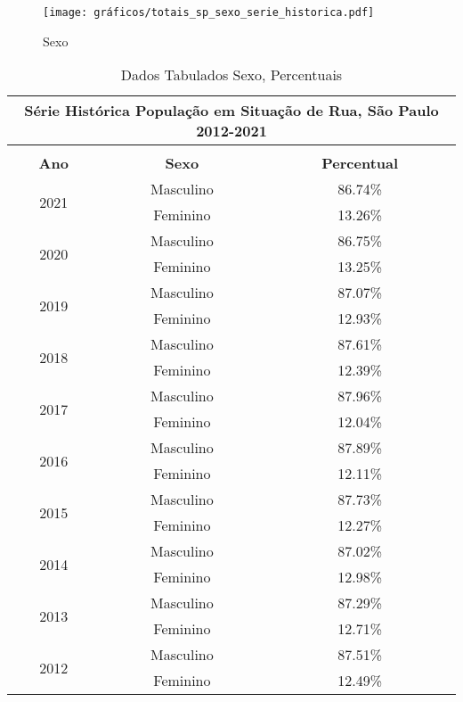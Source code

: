 \documentclass[14pt]{extarticle}
\begin{document}
\begin{figure}[H]
\centering
	\caption{Sexo}
	\texttt{[image: gráficos/totais\_sp\_sexo\_serie\_historica.pdf]}
	\label{fig:sexo}
\end{figure}



\begin{table}[htbp]
 \centering
  \caption{Dados Tabulados Sexo, Percentuais}
  \tabcolsep=0.15cm
	\renewcommand{\arraystretch}{1.0}
	\begin{adjustbox}{max width=\linewidth}
      \begin{tabular}{ccc}
    \toprule
    \multicolumn{3}{c}{Série Histórica População em Situação de Rua, São Paulo 2012-2021} \\
    \midrule
    \multicolumn{3}{c}{} \\
    \midrule
    \rowcolor[rgb]{ .906,  .902,  .902} \textbf{Ano} & \textbf{Sexo} & \textbf{Percentual} \\
    \midrule
    \multirow{2}[2]{*}{2021} & Masculino & 86.74\% \\
          & Feminino & 13.26\% \\
    \midrule
    \multirow{2}[2]{*}{2020} & Masculino & 86.75\% \\
          & Feminino & 13.25\% \\
    \midrule
    \multirow{2}[2]{*}{2019} & Masculino & 87.07\% \\
          & Feminino & 12.93\% \\
    \midrule
    \multirow{2}[2]{*}{2018} & Masculino & 87.61\% \\
          & Feminino & 12.39\% \\
    \midrule
    \multirow{2}[2]{*}{2017} & Masculino & 87.96\% \\
          & Feminino & 12.04\% \\
    \midrule
    \multirow{2}[2]{*}{2016} & Masculino & 87.89\% \\
          & Feminino & 12.11\% \\
    \midrule
    \multirow{2}[2]{*}{2015} & Masculino & 87.73\% \\
          & Feminino & 12.27\% \\
    \midrule
    \multirow{2}[2]{*}{2014} & Masculino & 87.02\% \\
          & Feminino & 12.98\% \\
    \midrule
    \multirow{2}[2]{*}{2013} & Masculino & 87.29\% \\
          & Feminino & 12.71\% \\
    \midrule
    \multirow{2}[2]{*}{2012} & Masculino & 87.51\% \\
          & Feminino & 12.49\% \\
    \bottomrule
    \end{tabular}%
 \end{adjustbox}
  \label{tab:sexo_percentual}%
\end{table}%
\end{document}
